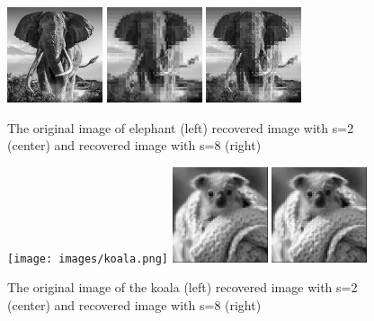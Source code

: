 \documentclass{article}
\begin{document}
\begin{figure}[H]
    \captionsetup{width=.75\linewidth}
    \centering
        \includegraphics[width=0.25\textwidth]{images/elephant.png}
        \includegraphics[width=0.25\textwidth]{images/elephant-recovered_02.png}
        \includegraphics[width=0.25\textwidth]{images/elephant-recovered_08.png}
        \caption{The original image of elephant (left) recovered image with s=2 (center) and recovered image with s=8 (right)}
\end{figure}

\begin{figure}[H]
    \captionsetup{width=.75\linewidth}
    \centering
        \texttt{[image: images/koala.png]}
        \includegraphics[width=0.25\textwidth]{images/koala-recovered_02.png}
        \includegraphics[width=0.25\textwidth]{images/koala-recovered_08.png}
        \caption{The original image of the koala (left) recovered image with s=2 (center) and recovered image with s=8 (right)}
\end{figure}
\end{document}
